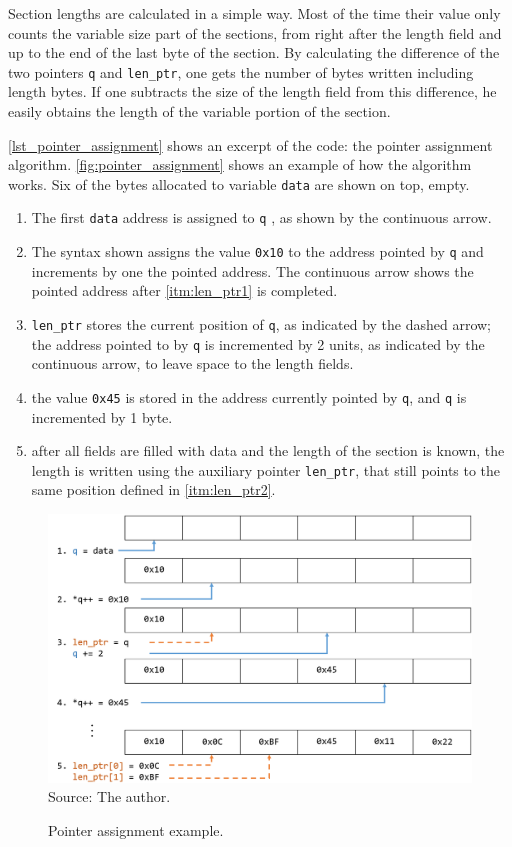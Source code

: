 \documentclass[
	12pt,				%
	openright,			%
	twoside,			%
	a4paper,			%
	brazil,
	french,				%
	english
	]{abntex2}
\begin{document}
Section lengths are calculated in a simple way. Most of the time their value only counts the variable size part of the sections, from right after the length field and up to the end of the last byte of the section. By calculating the difference of the two pointers \texttt{q} and \texttt{len\_ptr}, one gets the number of bytes written including length bytes. If one subtracts the size of the length field from this difference, he easily obtains the length of the variable portion of the section.

\autoref{lst_pointer_assignment} shows an excerpt of the code: the pointer assignment algorithm. \autoref{fig:pointer_assignment} shows an example of how the  algorithm works. Six of the bytes allocated to variable \texttt{data} are shown on top, empty.
\begin{enumerate}
\item The first \texttt{data} address is assigned to \texttt{q} , as shown by the continuous arrow.
\item \label{itm:len_ptr1} The syntax shown assigns the value \texttt{0x10} to the address pointed by \texttt{q} and increments by one the pointed address. The continuous arrow shows the pointed address after \autoref{itm:len_ptr1} is completed.
\item \label{itm:len_ptr2} \texttt{len\_ptr} stores the current position of \texttt{q}, as indicated by the dashed arrow; the address pointed to by \texttt{q} is incremented by 2 units, as indicated by the continuous arrow, to leave space to the length fields.
\item the value \texttt{0x45} is stored in the address currently pointed by \texttt{q}, and \texttt{q} is incremented by 1 byte.
\item after all fields are filled with data and the length of the section is known, the length is written using the auxiliary pointer \texttt{len\_ptr}, that still points to the same position defined in \autoref{itm:len_ptr2}.
\end{enumerate}

\begin{figure}[!h]
\centering
\caption{Pointer assignment example.}
\includegraphics[width=1\linewidth]{figuras/pointer_assignment.png}
\\Source: The author.
\label{fig:pointer_assignment}
\end{figure}
\end{document}
